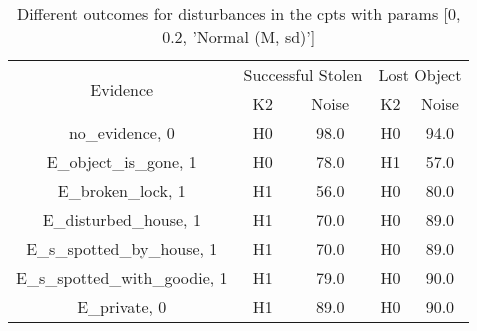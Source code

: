 \begin{table}\begin{tabular}{c|cc|cc}\toprule\multirow{2}{*}{Evidence} & \multicolumn{2}{c}{Successful Stolen} & \multicolumn{2}{c}{Lost Object} \\& {K2} & {Noise} & {K2} & {Noise} \\\midrule
no\_evidence, 0 & H0&98.0&\cellcolor{Bittersweet}H0&\cellcolor{Bittersweet}94.0\\E\_object\_is\_gone, 1 & \cellcolor{Bittersweet}H0&\cellcolor{Bittersweet}78.0&\cellcolor{Bittersweet}H1&\cellcolor{Bittersweet}57.0\\E\_broken\_lock, 1 & \cellcolor{Bittersweet}H1&\cellcolor{Bittersweet}56.0&\cellcolor{Bittersweet}H0&\cellcolor{Bittersweet}80.0\\E\_disturbed\_house, 1 & \cellcolor{Bittersweet}H1&\cellcolor{Bittersweet}70.0&\cellcolor{Bittersweet}H0&\cellcolor{Bittersweet}89.0\\E\_s\_spotted\_by\_house, 1 & \cellcolor{Bittersweet}H1&\cellcolor{Bittersweet}70.0&\cellcolor{Bittersweet}H0&\cellcolor{Bittersweet}89.0\\E\_s\_spotted\_with\_goodie, 1 & \cellcolor{Bittersweet}H1&\cellcolor{Bittersweet}79.0&\cellcolor{Bittersweet}H0&\cellcolor{Bittersweet}90.0\\E\_private, 0 & \cellcolor{Bittersweet}H1&\cellcolor{Bittersweet}89.0&\cellcolor{Bittersweet}H0&\cellcolor{Bittersweet}90.0\\\bottomrule\end{tabular}\caption{Different outcomes for disturbances in the cpts with params [0, 0.2, 'Normal (M, sd)']}\end{table}